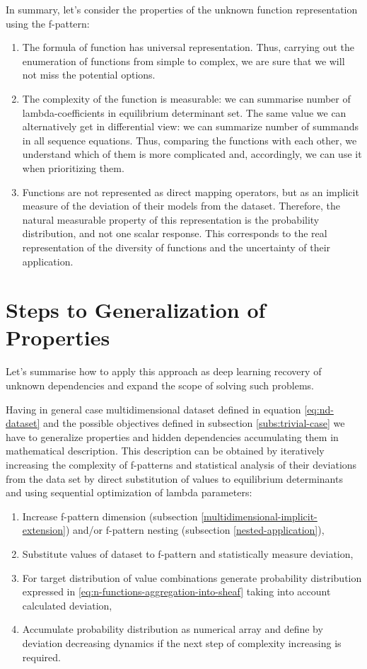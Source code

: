 \documentclass[a4paper, 11pt, oneside]{book}
\begin{document}
In summary, let's consider the properties of the unknown function representation using the f-pattern:
\begin{enumerate}
  \item The formula of function has universal representation. Thus, carrying out the enumeration of functions from simple to complex, we are sure that we will not miss the potential options.
  \item The complexity of the function is measurable: we can summarise number of lambda-coefficients in equilibrium determinant set. The same value we can alternatively get in differential view: we can summarize number of summands in all sequence equations. Thus, comparing the functions with each other, we understand which of them is more complicated and, accordingly, we can use it when prioritizing them.
  \item Functions are not represented as direct mapping operators, but as an implicit measure of the deviation of their models from the dataset. Therefore, the natural measurable property of this representation is the probability distribution, and not one scalar response. This corresponds to the real representation of the diversity of functions and the uncertainty of their application.
\end{enumerate}

\section{Steps to Generalization of Properties}
Let's summarise how to apply this approach as deep learning recovery of unknown dependencies and expand the scope of solving such problems.

Having in general case multidimensional dataset defined in equation \ref{eq:nd-dataset} and the possible objectives defined in subsection \ref{subs:trivial-case} we have to generalize properties and hidden dependencies accumulating them in mathematical description. This description can be obtained by iteratively increasing the complexity of f-patterns and statistical analysis of their deviations from the data set by direct substitution of values to equilibrium determinants and using sequential optimization of lambda parameters:

\begin{enumerate}
  \item Increase f-pattern dimension (subsection \ref{multidimensional-implicit-extension}) and/or f-pattern nesting (subsection \ref{nested-application}),
  \item Substitute values of dataset to f-pattern and statistically measure deviation,
  \item For target distribution of value combinations generate probability distribution expressed in \ref{eq:n-functions-aggregation-into-sheaf} taking into account calculated deviation,
  \item Accumulate probability distribution as numerical array and define by deviation decreasing dynamics if the next step of complexity increasing is required.
\end{enumerate}
\end{document}
